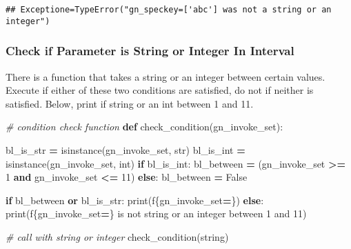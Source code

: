\documentclass[
]{book}
\newenvironment{Shaded}{\begin{snugshade}}{\end{snugshade}}
\newcommand{\BuiltInTok}[1]{#1}
\newcommand{\CommentTok}[1]{\textcolor[rgb]{0.56,0.35,0.01}{\textit{#1}}}
\newcommand{\ControlFlowTok}[1]{\textcolor[rgb]{0.13,0.29,0.53}{\textbf{#1}}}
\newcommand{\DecValTok}[1]{\textcolor[rgb]{0.00,0.00,0.81}{#1}}
\newcommand{\KeywordTok}[1]{\textcolor[rgb]{0.13,0.29,0.53}{\textbf{#1}}}
\newcommand{\NormalTok}[1]{#1}
\newcommand{\OperatorTok}[1]{\textcolor[rgb]{0.81,0.36,0.00}{\textbf{#1}}}
\newcommand{\SpecialCharTok}[1]{\textcolor[rgb]{0.00,0.00,0.00}{#1}}
\newcommand{\SpecialStringTok}[1]{\textcolor[rgb]{0.31,0.60,0.02}{#1}}
\newcommand{\StringTok}[1]{\textcolor[rgb]{0.31,0.60,0.02}{#1}}
\newcommand{\VariableTok}[1]{\textcolor[rgb]{0.00,0.00,0.00}{#1}}
\begin{document}
\begin{verbatim}
## Exceptione=TypeError("gn_speckey=['abc'] was not a string or an integer")
\end{verbatim}

\hypertarget{check-if-parameter-is-string-or-integer-in-interval}{%
\subsubsection{Check if Parameter is String or Integer In Interval}\label{check-if-parameter-is-string-or-integer-in-interval}}

There is a function that takes a string or an integer between certain values. Execute if either of these two conditions are satisfied, do not if neither is satisfied. Below, print if string or an int between 1 and 11.

\begin{Shaded}
\begin{Highlighting}[]
\CommentTok{\# condition check function}
\KeywordTok{def}\NormalTok{ check\_condition(gn\_invoke\_set):}

\NormalTok{  bl\_is\_str }\OperatorTok{=} \BuiltInTok{isinstance}\NormalTok{(gn\_invoke\_set, }\BuiltInTok{str}\NormalTok{)}
\NormalTok{  bl\_is\_int }\OperatorTok{=} \BuiltInTok{isinstance}\NormalTok{(gn\_invoke\_set, }\BuiltInTok{int}\NormalTok{)}
  \ControlFlowTok{if}\NormalTok{ bl\_is\_int:}
\NormalTok{    bl\_between }\OperatorTok{=}\NormalTok{ (gn\_invoke\_set }\OperatorTok{\textgreater{}=} \DecValTok{1} \KeywordTok{and}\NormalTok{ gn\_invoke\_set }\OperatorTok{\textless{}=} \DecValTok{11}\NormalTok{)}
  \ControlFlowTok{else}\NormalTok{: }
\NormalTok{    bl\_between }\OperatorTok{=} \VariableTok{False}
    
  \ControlFlowTok{if}\NormalTok{ bl\_between }\KeywordTok{or}\NormalTok{ bl\_is\_str:}
      \BuiltInTok{print}\NormalTok{(}\SpecialStringTok{f\textquotesingle{}}\SpecialCharTok{\{}\NormalTok{gn\_invoke\_set}\OperatorTok{=}\SpecialCharTok{\}}\SpecialStringTok{\textquotesingle{}}\NormalTok{)}
  \ControlFlowTok{else}\NormalTok{:}
      \BuiltInTok{print}\NormalTok{(}\SpecialStringTok{f\textquotesingle{}}\SpecialCharTok{\{}\NormalTok{gn\_invoke\_set}\OperatorTok{=}\SpecialCharTok{\}}\SpecialStringTok{ is not string or an integer between 1 and 11\textquotesingle{}}\NormalTok{)}
      
\CommentTok{\# call with string or integer}
\NormalTok{check\_condition(}\StringTok{\textquotesingle{}string\textquotesingle{}}\NormalTok{)}
\end{Highlighting}
\end{Shaded}
\end{document}
